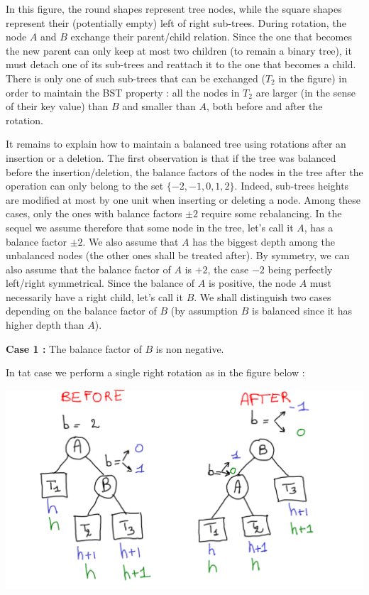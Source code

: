 \documentclass[12pt]{article}
\theoremstyle{plain}
\theoremstyle{remark}
\begin{document}
In this figure, the round shapes represent tree nodes, while the square shapes
represent their (potentially empty) left of right sub-trees. During rotation, 
the node $A$ and $B$ exchange their parent/child relation. Since the one that
becomes the new parent can only keep at most two children (to remain a binary
tree), it must detach one of its sub-trees and reattach it to the one that
becomes a child. There is only one of such sub-trees that can be exchanged
($T_2$ in the figure) in order to maintain the BST property : all the 
nodes in $T_2$ are larger (in the sense of their key value) than $B$ and smaller
than $A$, both before and after the rotation. 

\medskip

It remains to explain how to maintain a balanced tree using rotations after an
insertion or a deletion. The first observation is that if the tree was balanced
before the insertion/deletion, the balance factors of the nodes in the tree after the
operation can only belong to the set $\{-2, -1, 0, 1, 2\}.$  Indeed, sub-trees
heights are modified at most by one unit when inserting or deleting a node.
Among these cases, only the ones with balance factors $\pm 2$ require some
rebalancing. In the sequel we assume therefore that some node in the tree, let's
call it $A$, has a balance factor $\pm 2$. We also assume that $A$ has the biggest 
depth among the unbalanced nodes (the other ones shall be treated after). By
symmetry, we can also assume that the balance factor of $A$ is $+2$, the case
$-2$ being perfectly left/right symmetrical.
Since the balance of $A$ is positive, the node $A$ must necessarily have a right
child, let's call it $B$. We shall distinguish two cases depending on the
balance factor of $B$ (by assumption $B$ is balanced since it has higher depth
than $A$).

\medskip

{\bf Case 1 :} The balance factor of $B$ is non negative.


In tat case we perform a single right rotation as in the figure below :


\begin{center}
	\includegraphics[width=14cm]{data/rebalance_simple.pdf}
\end{center}
\end{document}
